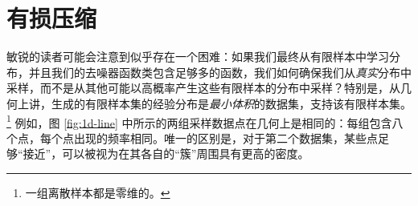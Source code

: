 \documentclass[../../book-main.tex]{subfiles}
\begin{document}










\section{有损压缩} \label{sec:lossy_compression}


敏锐的读者可能会注意到似乎存在一个困难：如果我们最终从有限样本中学习分布，并且我们的去噪器函数类包含足够多的函数，我们如何确保我们从\textit{真实}分布中采样，而不是从其他可能以高概率产生这些有限样本的分布中采样？特别是，从几何上讲，生成的有限样本集的经验分布是{\em 最小体积}的数据集，支持该有限样本集。\footnote{一组离散样本都是零维的。} 例如，图 \ref{fig:1d-line} 中所示的两组采样数据点在几何上是相同的：每组包含八个点，每个点出现的频率相同。唯一的区别是，对于第二个数据集，某些点足够“接近”，可以被视为在其各自的“簇”周围具有更高的密度。
\end{document}
